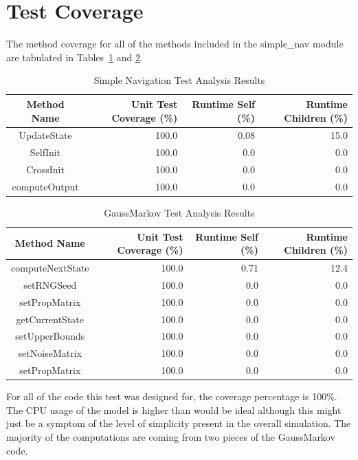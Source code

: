 \documentclass[]{BasiliskReportMemo}
\begin{document}
\section{Test Coverage}
The method coverage for all of the methods included in the simple\_nav 
module are tabulated in Tables~\ref{tab:cov_met} and \ref{tab:cov_met2}.

\begin{table}[htbp]
    \caption{Simple Navigation Test Analysis Results}
   \label{tab:cov_met}
        \centering \fontsize{10}{10}\selectfont
   \begin{tabular}{c | r | r | r} %
      \hline
      Method Name    & Unit Test Coverage (\%) & Runtime Self (\%) & Runtime Children (\%) \\
      \hline
      UpdateState & 100.0 & 0.08 & 15.0 \\
      SelfInit & 100.0 & 0.0 & 0.0 \\
      CrossInit & 100.0 & 0.0 & 0.0 \\
      computeOutput & 100.0 & 0.0 & 0.0 \\
      \hline
   \end{tabular}
\end{table}

\begin{table}[htbp]
    \caption{GaussMarkov Test Analysis Results}
   \label{tab:cov_met2}
        \centering \fontsize{10}{10}\selectfont
   \begin{tabular}{c | r | r | r} %
      \hline
      Method Name    & Unit Test Coverage (\%) & Runtime Self (\%) & Runtime Children (\%) \\
      \hline
      computeNextState & 100.0 & 0.71 & 12.4 \\
      setRNGSeed & 100.0 & 0.0 & 0.0 \\
      setPropMatrix & 100.0 & 0.0 & 0.0 \\
      getCurrentState & 100.0 & 0.0 & 0.0 \\
      setUpperBounds & 100.0 & 0.0 & 0.0 \\
      setNoiseMatrix & 100.0 & 0.0 & 0.0 \\
      setPropMatrix & 100.0 & 0.0 & 0.0 \\
      \hline
   \end{tabular}
\end{table}
For all of the code this test was designed for, the coverage percentage is 
100\%.  The CPU usage of the model is higher than would be ideal although this 
might just be a symptom of the level of simplicity present in the overall 
simulation.  The majority of the computations are coming from two pieces of the 
GaussMarkov code.  
\end{document}
